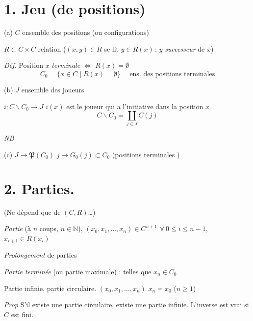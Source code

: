 \documentclass[11pt,a4paper]{article}
\begin{document}
\section*{1. Jeu (de positions)}

(a) $C$ ensemble des positions (ou configurations)

$R\subset C\times C$ relation ($(x,y)\in R$ se lit $y\in R(x)$\,: $y$ \emph{successeur} de $x$)

\emph{Déf.} Position $x$ \emph{terminale} $\Longleftrightarrow$ $R(x)=\emptyset$
\[
  C_0=\{x\in C\mid R(x)=\emptyset\}=\text{ens.\ des positions terminales}
\]

(b) $J$ ensemble des joueurs

$i : C\smallsetminus C_0\to J$ \qquad $i(x)$ est le joueur qui a l'initiative dans la position $x$
\[
  C\smallsetminus C_0=\coprod_{j\in J}C(j)
\]

\emph{NB} 

(c) $J\to\mathfrak{P}(C_0)$ \qquad $j\mapsto G_0(j)\subset C_0$ \quad (positions terminales )

\section*{2. Parties.}

(Ne dépend que de $(C,R)$…)

\emph{Partie} (à $n$ coups, $n\in\mathbb{N}$), $(x_0,x_1,\ldots,x_n)\in C^{n+1}$ \qquad $\forall\ 0\leqslant i\leqslant n-1$, $x_{i+1}\in R(x_i)$

\emph{Prolongement} de parties

\emph{Partie terminée} (ou partie maximale) : telles que $x_n\in C_0$

Partie infinie, partie circulaire. $(x_0,x_1,\ldots,x_n)$ \quad $x_n=x_0$ \quad ($n\geqslant 1$)

\emph{Prop} S'il existe une partie circulaire, existe une partie infinie. L'inverse est vrai si $C$ est fini.
\end{document}
